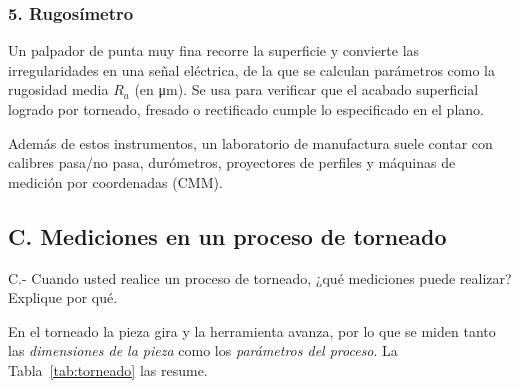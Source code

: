 \documentclass[12pt,a4paper]{article}
\begin{document}
\subsubsection*{5. Rugosímetro}
Un palpador de punta muy fina recorre la superficie y convierte las
irregularidades en una señal eléctrica, de la que se calculan parámetros como la
rugosidad media $R_a$ (en \si{\micro\metre}). Se usa para verificar que el
acabado superficial logrado por torneado, fresado o rectificado cumple lo
especificado en el plano.

\medskip
Además de estos instrumentos, un laboratorio de manufactura suele contar con
calibres pasa/no pasa, durómetros, proyectores de perfiles y máquinas de
medición por coordenadas (CMM).

\subsection*{C. Mediciones en un proceso de torneado}

\begin{enunciado}
	C.- Cuando usted realice un proceso de torneado, ¿qué mediciones puede
	realizar?
	Explique por qué.
\end{enunciado}

En el torneado la pieza gira y la herramienta avanza, por lo que se miden tanto
las \emph{dimensiones de la pieza} como los \emph{parámetros del proceso}. La
Tabla~\ref{tab:torneado} las resume.
\end{document}
